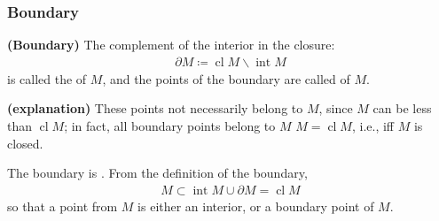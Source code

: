 \documentclass{article}
\newcommand{\bfs}[1]{\textbf{({#1}) }}
\newcommand{\inte}{\operatorname{int}}
\begin{document}
\subsubsection{Boundary}
\begin{defa}{\bfs{Boundary}}
 The complement of the interior in the closure:
\begin{align*}
\partial M\coloneqq\operatorname{cl} M \backslash \inte M
\end{align*}
is called the  of $M$, and the points of the boundary are called  of $M$.
\end{defa}

\begin{rema}{\bfs{explanation}}
These points not necessarily belong to $M$, since $M$ can be less than $\operatorname{cl} M$; in fact, all boundary points belong to $M$  $M=\operatorname{cl} M$, i.e., iff $M$ is closed.
\end{rema}

The boundary is . From the definition of the boundary,
\begin{align}
M \subset \operatorname{int} M \cup \partial M =\operatorname{cl} M\label{eq:b_m_c}
\end{align}
so that a point from $M$ is either an interior, or a boundary point of $M$.
\end{document}
